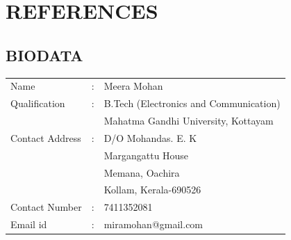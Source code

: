 \documentclass[a4paper,12pt]{report}
\begin{document}
\newpage
 

\newpage
 

\newpage
 

\newpage
 


\newpage
 

\newpage



\chapter{REFERENCES}




\newpage
\pagestyle{plain}
\section*{\centering BIODATA}
\begin{tabular}{lll}
Name			&:	&Meera Mohan			\\

Qualification 		&:	&B.Tech (Electronics and Communication)	\\

			&	&Mahatma Gandhi University, Kottayam			\\

Contact Address 	&:	&D/O Mohandas. E. K			\\
		
			&	&Margangattu House		\\
		
			&	&Memana, Oachira		\\

			&	&Kollam, Kerala-690526		\\

Contact Number  	&:	&7411352081				\\

Email id		&:	&miramohan@gmail.com			\\

\end{tabular}



\end{document}
